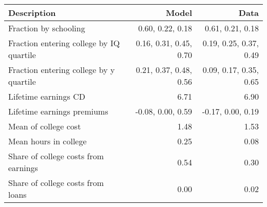 \begin{tabular}{lrr}
\hline
Description & Model  & Data  \\ 
\hline
Fraction by schooling & 0.60, 0.22, 0.18  & 0.61, 0.21, 0.18  \\ 
Fraction entering college by IQ quartile & 0.16, 0.31, 0.45, 0.70  & 0.19, 0.25, 0.37, 0.49  \\ 
Fraction entering college by y quartile & 0.21, 0.37, 0.48, 0.56  & 0.09, 0.17, 0.35, 0.65  \\ 
Lifetime earnings CD & 6.71  & 6.90  \\ 
Lifetime earnings premiums & -0.08, 0.00, 0.59  & -0.17, 0.00, 0.19  \\ 
Mean of college cost & 1.48  & 1.53  \\ 
Mean hours in college & 0.25  & 0.08  \\ 
Share of college costs from earnings & 0.54  & 0.30  \\ 
Share of college costs from loans & 0.00  & 0.02  \\ 
\hline
\end{tabular}%
